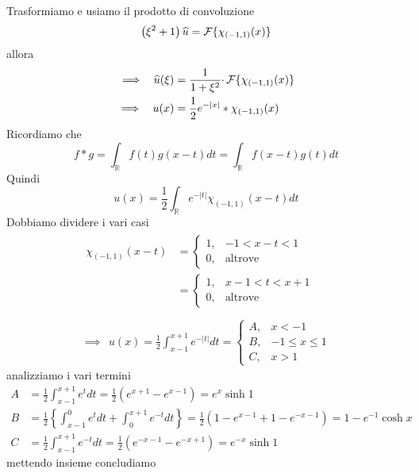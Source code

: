 Trasformiamo e usiamo il prodotto di convoluzione
\begin{equation*}
\left( \xi ^{2} +1\right)\widehat{u} =\mathcal{F} \{\chi _{( -1,1)}( x)\}
\end{equation*}
allora
\begin{align*}
\implies \ \ \widehat{u}( \xi ) & =\frac{1}{1+\xi ^{2}} \cdotp \mathcal{F} \{\chi _{( -1,1)}( x)\}\\
\implies \ \ u( x) & =\frac{1}{2} e^{-| x| } *\chi _{( -1,1)}( x)
\end{align*}
Ricordiamo che
\begin{equation*}
f*g=\int _{\mathbb{R}} f( t) g( x-t) dt=\int _{\mathbb{R}} f( x-t) g( t) dt
\end{equation*}
Quindi
\begin{equation*}
u( x) =\frac{1}{2}\int _{\mathbb{R}} e^{-| t| } \chi _{( -1,1)}( x-t) dt
\end{equation*}
Dobbiamo dividere i vari casi
\begin{gather*}
\begin{aligned}
\chi _{( -1,1)}( x-t) & =\begin{cases}
1, & -1< x-t< 1\\
0, & \text{altrove}
\end{cases}\\
 & =\begin{cases}
1, & x-1< t< x+1\\
0, & \text{altrove}
\end{cases}
\end{aligned}\\
\\
\implies \ \ u( x) =\frac{1}{2}\int ^{x+1}_{x-1} e^{-| t| } dt=\begin{cases}
A, & x< -1\\
B, & -1\leqslant x\leqslant 1\\
C, & x >1
\end{cases}
\end{gather*}
analizziamo i vari termini
\begin{align*}
A & =\frac{1}{2}\int ^{x+1}_{x-1} e^{t} dt=\frac{1}{2}\left( e^{x+1} -e^{x-1}\right) =e^{x}\sinh 1\\
B & =\frac{1}{2}\left\{\int ^{0}_{x-1} e^{t} dt+\int ^{x+1}_{0} e^{-t} dt\right\} =\frac{1}{2}\left( 1-e^{x-1} +1-e^{-x-1}\right) =1-e^{-1}\cosh x\\
C & =\frac{1}{2}\int ^{x+1}_{x-1} e^{-t} dt=\frac{1}{2}\left( e^{-x-1} -e^{-x+1}\right) =e^{-x}\sinh 1
\end{align*}
mettendo insieme concludiamo
